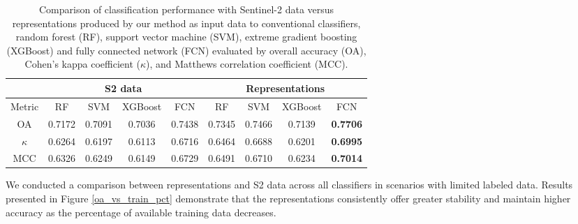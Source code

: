 \documentclass[journal,article,submit,pdftex,moreauthors]{Definitions/mdpi}
\begin{document}

\begin{table}[H]
    \centering
    \caption{Comparison of classification performance with Sentinel-2 data versus representations produced by our method as input data to conventional classifiers, random forest (RF), support vector machine (SVM), extreme gradient boosting (XGBoost) and fully connected network (FCN) evaluated by overall accuracy (OA), Cohen’s kappa coefficient ($\kappa$), and Matthews correlation coefficient (MCC).}
    \begin{tabular}{c|c c c c| c c c c}
    \hline 
        & \multicolumn{4}{c|}{S2 data} & \multicolumn{4}{c}{Representations}\\ \hline
        Metric &    RF  &   SVM  &   XGBoost &   FCN    &    RF   &   SVM     &   XGBoost &   FCN \\ \hline
         OA   & 0.7172 & 0.7091 &   0.7036  &  0.7438  &  0.7345 &   0.7466  &   0.7139  & \textbf{0.7706}\\ 
         $\kappa$    & 0.6264 & 0.6197 &   0.6113  &  0.6716  &  0.6464 &   0.6688  &   0.6201  & \textbf{0.6995}\\ 
         MCC   & 0.6326 & 0.6249 &   0.6149  &  0.6729  &  0.6491 &   0.6710  &   0.6234  & \textbf{0.7014} \\ \hline
    \end{tabular}
    \label{Classification_performance_evaluation_conventional_classifiers}
\end{table}

We conducted a comparison between representations and S2 data across all classifiers in scenarios with limited labeled data. Results presented in Figure \ref{oa_vs_train_pct} demonstrate that the representations consistently offer greater stability and maintain higher accuracy as the percentage of available training data decreases.
\end{document}
